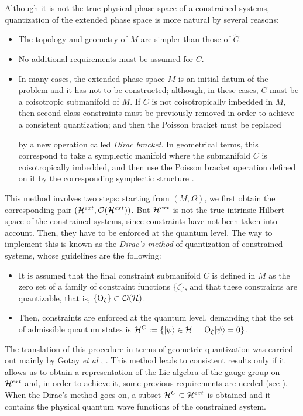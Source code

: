 \documentclass[12pt]{article}
\def\H{{\cal H}}
\def\He{{\cal H}^{ext}}
\def\Hc{{\cal H}^C}
\def\sta{|\psi \rangle }
\def\Op{{\rm O}}
\begin{document}
Although it is not the true physical phase space of a constrained
systems,
quantization of the extended phase space is more natural by several
reasons:
\begin{itemize}
\item
The topology and geometry of $M$ are simpler than those of $\tilde C$.
\item
No additional requirements must be assumed for $C$.
\item
In many cases, the extended phase space $M$ is
an initial datum of the problem and it has not to be constructed;
although, in these cases, $C$ must be a coisotropic submanifold of $M$.
If $C$ is not coisotropically imbedded in $M$, then
second class constraints must be previously removed in order to achieve
a consistent quantization; and then the Poisson bracket must be replaced

by
a new operation called {\it Dirac bracket}.
In geometrical terms, this correspond to take
a symplectic manifold where the submanifold $C$
is coisotropically imbedded, and then use the Poisson bracket
operation defined on it by the corresponding symplectic structure
\cite{Sn-74}.
\end{itemize}
This method involves two steps:
starting from $(M,\Omega )$, we first obtain the corresponding pair
$(\He ,{\cal O}(\He ))$.
But $\He$ is not the true intrinsic Hilbert space of the constrained
systems, since constraints
have not been taken into account. Then, they have to be enforced at the
quantum level.
The way to implement this is known as the
{\it Dirac's method} of quantization of constrained systems,
whose guidelines are the following:
\begin{itemize}
\item
It is assumed that the final constraint submanifold $C$
is defined in $M$ as the zero set of a family of constraint functions
$\{ \zeta \}$,
and that these constraints are quantizable, that is,
$\{ \Op_\zeta \} \subset {\cal O}(\H )$.
\item
Then, constraints are enforced at the quantum level,
demanding that the set of admissible quantum states is
$\Hc := \{ \sta \in \H \ \mid \ \Op_\zeta \sta = 0 \}$.
\end{itemize}

The translation of this procedure in terms of geometric quantization
was carried out mainly by Gotay {\it et al}  \cite{Go-cit},
\cite{GS-81}.
This method leads to consistent results only if
it allows us to obtain a representation of the Lie algebra
of the gauge group on $\He$ and, in order to achieve it,
some previous requirements are needed (see \cite{GS-81}).
When the Dirac's method goes on,
a subset $\Hc \subset \He$ is obtained and it contains
the physical quantum wave functions of the constrained system.
\end{document}
